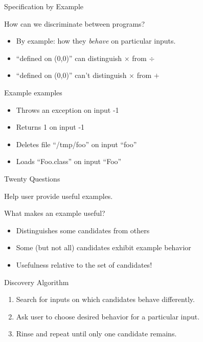 \documentclass{beamer}
\begin{document}
\begin{frame}{Specification by Example}
\begin{block}{How can we discriminate between programs?}
\begin{itemize}
\item{By example: how they {\em behave} on particular inputs.}
  \item{``defined on (0,0)'' can distinguish $\times$ from $\div$}
  \item{``defined on (0,0)'' can't distinguish $\times$ from $+$}
\end{itemize}
\end{block}

\begin{block}{Example examples}
\begin{itemize}
\item{Throws an exception on input \hspace{1mm}-1}
\item{Returns 1 on input \hspace{1mm}-1}
\item{Deletes file ``/tmp/foo'' on input ``foo''}
\item{Loads ``Foo.class'' on input ``Foo''}
\end{itemize}
\end{block}
\end{frame}

\begin{frame}{Twenty Questions}
  \begin{center}Help user provide useful examples.\end{center}

  \begin{block}{What makes an example useful?}
  \begin{itemize}
  \item{Distinguishes some candidates from others}
  \item{Some (but not all) candidates exhibit example behavior}
  \item{Usefulness relative to the set of candidates!}
  \end{itemize}
  \end{block}

  \begin{block}{Discovery Algorithm}
  \begin{enumerate}
  \item{Search for inputs on which candidates behave differently.}
  \item{Ask user to choose desired behavior for a particular input.}
  \item{Rinse and repeat until only one candidate remains.}
  \end{enumerate}
  \end{block}
\end{frame}
\end{document}
